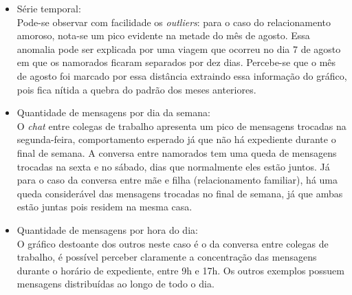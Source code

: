 \begin{itemize}
    \item Série temporal:\\
    Pode-se observar com facilidade os \textit{outliers}: para o caso do relacionamento amoroso, nota-se um pico evidente na metade do mês de agosto. Essa anomalia pode ser explicada por uma viagem que ocorreu no dia 7 de agosto em que os namorados ficaram separados por dez dias. Percebe-se que o mês de agosto foi marcado por essa distância extraindo essa informação do gráfico, pois fica nítida a quebra do padrão dos meses anteriores.
    
    \item Quantidade de mensagens por dia da semana:\\
    O \textit{chat} entre colegas de trabalho apresenta um pico de mensagens trocadas na segunda-feira, comportamento esperado já que não há expediente durante o final de semana. A conversa entre namorados tem uma queda de mensagens trocadas na sexta e no sábado, dias que normalmente eles estão juntos. Já para o caso da conversa entre mãe e filha (relacionamento familiar), há uma queda considerável das mensagens trocadas no final de semana, já que ambas estão juntas pois residem na mesma casa.
    
    \item Quantidade de mensagens por hora do dia:\\
    O gráfico destoante dos outros neste caso é o da conversa entre colegas de trabalho, é possível perceber claramente a concentração das mensagens durante o horário de expediente, entre 9h e 17h. Os outros exemplos possuem mensagens distribuídas ao longo de todo o dia.
\end{itemize}